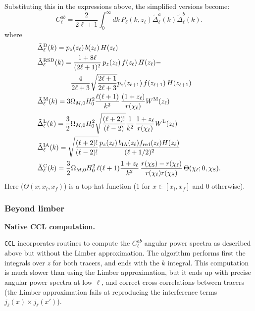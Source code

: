 \documentclass[\docopts]{\docclass}
\newcommand{\ccl}{{\tt CCL}\xspace}
\begin{document}
Substituting this in the expressions above, the simplified versions become:
\begin{equation}\label{eq:limber}
 C^{ab}_\ell=\frac{2}{2\ell+1}\int_0^\infty dk\,P_\delta\left(k,z_\ell\right)
 \tilde{\Delta}^a_\ell(k)\tilde{\Delta}^b_\ell(k).
\end{equation}
where
\begin{align}
 &\tilde{\Delta}_\ell^{\rm D}(k)=p_z(z_\ell)\,b(z_\ell)\,H(z_\ell)\\
 &\tilde{\Delta}_\ell^{\rm RSD}(k)=
 \frac{1+8\ell}{(2\ell+1)^2}\,p_z(z_\ell)\,f(z_\ell)\,H(z_\ell)-\\
 &\hspace{48pt}\frac{4}{2\ell+3}\sqrt{\frac{2\ell+1}{2\ell+3}}p_z(z_{\ell+1})\,f(z_{\ell+1})\,H(z_{\ell+1})\\
 &\tilde{\Delta}_\ell^{\rm M}(k)=3\Omega_{M,0}H_0^2\frac{\ell(\ell+1)}{k^2}\,
 \frac{(1+z_\ell)}{r(\chi_\ell)}W^{\rm M}(z_\ell)\\
 &\tilde{\Delta}_\ell^{\rm L}(k)=\frac{3}{2}\Omega_{M,0}H_0^2\sqrt{\frac{(\ell+2)!}{(\ell-2)}}\frac{1}{k^2}\,
 \frac{1+z_\ell}{r(\chi_\ell)}W^{\rm L}(z_\ell)\\
 &\tilde{\Delta}_\ell^{\rm IA}(k)=\sqrt{\frac{(\ell+2)!}{(\ell-2)!}}\frac{p_z(z_\ell)\,b_{\rm IA}(z_\ell)f_{\rm red}(z_\ell)H(z_\ell)}{(\ell+1/2)^2}\\
 &\tilde{\Delta}_\ell^{\rm C}(k)=\frac{3}{2}\Omega_{M,0}H_0^2\,\ell(\ell+1)\frac{1+z_\ell}{k^2}\,\frac{r(\chi_{\rm S})-r(\chi_\ell)}{r(\chi_\ell)r(\chi_{\rm S})}\,\Theta(\chi_\ell;0,\chi_{\rm S}).
\end{align}
Here ($\Theta(x;x_i,x_f)$) is a top-hat function (1 for $x\in[x_i,x_f]$ and 0 otherwise).

%
%

\subsubsection{Beyond limber}

{\bf Native CCL computation.}

\ccl incorporates routines to compute the $C^{ab}_\ell$ angular power spectra as described above but without the Limber approximation. The algorithm performs first the integrals over $z$ for both tracers, and ends with the $k$ integral. This computation is much slower than using the Limber approximation, but it ends up with precise angular power spectra at low $\ell$, and correct cross-correlations between tracers (the Limber approximation fails at reproducing the interference terms $j_\ell(x)\times j_\ell(x')$).
\end{document}
